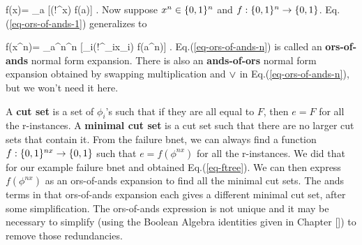 \beq
f(x)= \V_{a\in\bool} [(!^{}x) f(a)]
\label{eq-ors-of-ands-1}
\;.
\eeq
Now suppose $x^n\in \{0,1\}^n$
and $f:\{0,1\}^n\rightarrow \{0,1\}$.
Eq.(\ref{eq-ors-of-ands-1})
generalizes to

\beq
f(x^n)= \V_{a^n\in\bool^n}
 [\prod_i(!^{_i}x_i) f(a^n)]
\label{eq-ors-of-ands-n}
\;.
\eeq
Eq.(\ref{eq-ors-of-ands-n})
is called an {\bf ors-of-ands} normal form 
expansion.
There is also an {\bf ands-of-ors} normal
form expansion 
obtained by swapping multiplication
and $\vee$
in Eq.(\ref{eq-ors-of-ands-n}), 
but we won't need it here.

A {\bf cut
set} is a set
of $\phi_i$'s such that
if they are all equal to $F$,
then $e=F$ for all the
r-instances.
A {\bf minimal cut set}
is a cut set such that there
are no larger cut sets that contain it.
From the failure bnet,
we can always find 
a function $f:\{0,1\}^{nx}\rightarrow\{0,1\}$
such that
$e=f(\phi^{nx})$
for all the r-instances.
We did that for our
example failure
bnet and obtained Eq.(\ref{eq-ftree}).
We can
then
express 
$f(\phi^{nx})$ as an ors-of-ands expansion
to find all the minimal cut sets.
The ands
terms in that ors-of-ands
expansion 
each gives
a different minimal cut set,
after some simplification.
The ors-of-ands
expression
is not unique
and it may be necessary to simplify 
(using the Boolean Algebra identities
given in Chapter [])
to remove those redundancies.